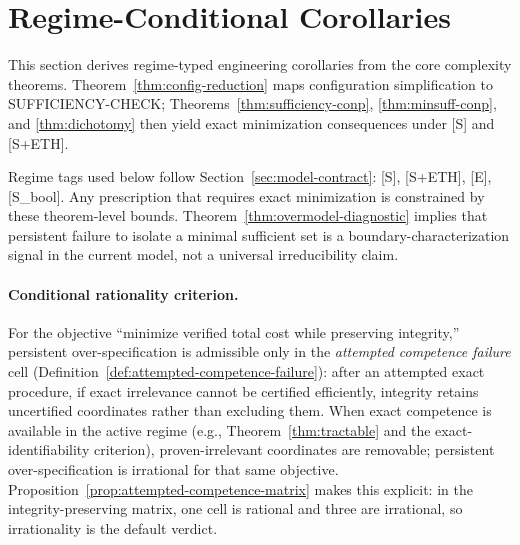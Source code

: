 \section{Regime-Conditional Corollaries}\label{sec:engineering-justification}

This section derives regime-typed engineering corollaries from the core complexity theorems. Theorem~\ref{thm:config-reduction} maps configuration simplification to SUFFICIENCY-CHECK; Theorems~\ref{thm:sufficiency-conp}, \ref{thm:minsuff-conp}, and \ref{thm:dichotomy} then yield exact minimization consequences under [S] and [S+ETH].

Regime tags used below follow Section~\ref{sec:model-contract}: [S], [S+ETH], [E], [S\_bool].
Any prescription that requires exact minimization is constrained by these theorem-level bounds.
Theorem~\ref{thm:overmodel-diagnostic} implies that persistent failure to isolate a minimal sufficient set is a boundary-characterization signal in the current model, not a universal irreducibility claim.

\paragraph{Conditional rationality criterion.}
For the objective ``minimize verified total cost while preserving integrity,'' persistent over-specification is admissible only in the \emph{attempted competence failure} cell (Definition~\ref{def:attempted-competence-failure}): after an attempted exact procedure, if exact irrelevance cannot be certified efficiently, integrity retains uncertified coordinates rather than excluding them.
When exact competence is available in the active regime (e.g., Theorem~\ref{thm:tractable} and the exact-identifiability criterion), proven-irrelevant coordinates are removable; persistent over-specification is irrational for that same objective.
Proposition~\ref{prop:attempted-competence-matrix} makes this explicit: in the integrity-preserving matrix, one cell is rational and three are irrational, so irrationality is the default verdict.

